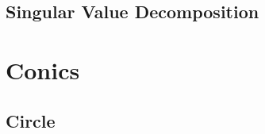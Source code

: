 \documentclass[11pt]{book}
\begin{document}
\section{Singular Value Decomposition}

%
%
%
%
%
%
%

%


\chapter{Conics}
\section{Circle}

\end{document}
